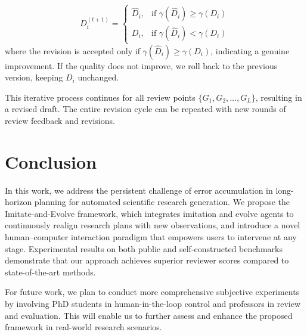 \documentclass[manuscript,review,anonymous]{acmart}
\begin{document}
\begin{equation}
  D_i^{(t+1)} =
  \begin{cases}
      \hat{D}_i, & \text{if } \gamma(\hat{D}_i) \geq \gamma(D_i) \\
      D_i, & \text{if } \gamma(\hat{D}_i) < \gamma(D_i)
  \end{cases}
\end{equation}
where the revision is accepted only if $\gamma(\hat{D}_i) \geq \gamma(D_i)$, indicating a genuine improvement. If the quality does not improve, we roll back to the previous version, keeping $D_i$ unchanged.

This iterative process continues for all review points $\{G_1, G_2, \ldots, G_L\}$, resulting in a revised draft. The entire revision cycle can be repeated with new rounds of review feedback and revisions.

\section{Conclusion}

In this work, we address the persistent challenge of error accumulation in long-horizon planning for automated scientific research generation. We propose the Imitate-and-Evolve framework, which integrates imitation and evolve agents to continuously realign research plans with new observations, and introduce a novel human–computer interaction paradigm that empowers users to intervene at any stage. Experimental results on both public and self-constructed benchmarks demonstrate that our approach achieves superior reviewer scores compared to state-of-the-art methods.

For future work, we plan to conduct more comprehensive subjective experiments by involving PhD students in human-in-the-loop control and professors in review and evaluation. This will enable us to further assess and enhance the proposed framework in real-world research scenarios.



\end{document}
